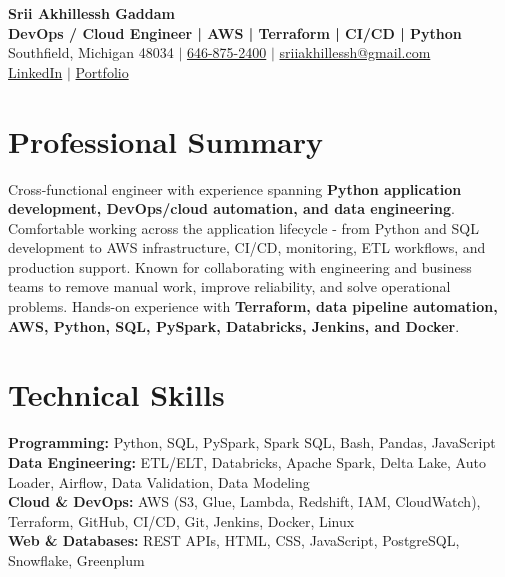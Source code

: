 \documentclass[letterpaper,10pt]{article}
\begin{document}
\fontsize{9.35pt}{10.45pt}\selectfont

\begin{center}
    {\LARGE \textbf{Srii Akhillessh Gaddam}} \\[-1pt]
    \textbf{DevOps / Cloud Engineer | AWS | Terraform | CI/CD | Python} \\[2pt]
    Southfield, Michigan 48034 $|$
    \href{tel:6468752400}{646-875-2400} $|$
    \href{mailto:sriiakhillessh@gmail.com}{sriiakhillessh@gmail.com} \\[1pt]
    \href{https://www.linkedin.com/in/srii-akhiilessh-gaddam-b48668191/}{LinkedIn} $|$
    \href{https://sriiakhillesshg.github.io/portfolio/}{Portfolio}
\end{center}
\vspace{-8pt}

\section{Professional Summary}
\small{Cross-functional engineer with experience spanning \textbf{Python application development, DevOps/cloud automation, and data engineering}. Comfortable working across the application lifecycle - from Python and SQL development to AWS infrastructure, CI/CD, monitoring, ETL workflows, and production support. Known for collaborating with engineering and business teams to remove manual work, improve reliability, and solve operational problems. Hands-on experience with \textbf{Terraform, data pipeline automation, AWS, Python, SQL, PySpark, Databricks, Jenkins, and Docker}.}

\section{Technical Skills}
\small{
\textbf{Programming:} Python, SQL, PySpark, Spark SQL, Bash, Pandas, JavaScript \\
\textbf{Data Engineering:} ETL/ELT, Databricks, Apache Spark, Delta Lake, Auto Loader, Airflow, Data Validation, Data Modeling \\
\textbf{Cloud \& DevOps:} AWS (S3, Glue, Lambda, Redshift, IAM, CloudWatch), Terraform, GitHub, CI/CD, Git, Jenkins, Docker, Linux \\
\textbf{Web \& Databases:} REST APIs, HTML, CSS, JavaScript, PostgreSQL, Snowflake, Greenplum
}
\end{document}
